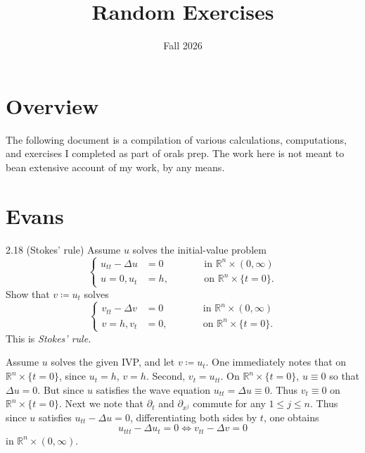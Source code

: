\documentclass{article}
\title{Random Exercises}
\author{\me}
\date{Fall 2026}
\begin{document}
\maketitle
\fullline 
\tableofcontents
\xappto\thefootnote{\relax}
\halfline 
\newpage 
\setlength{\parskip}{0.55em}

\section{Overview}

The following document is a compilation of various calculations, computations, and exercises I completed as part of orals prep. The work here is not meant to bean extensive account of my work, by any means. 

\newpage 

\section{Evans} 

\begin{prb}{2.18}
	(Stokes' rule) Assume $u$ solves the initial-value problem 
	\begin{equation*}
		\left\{
		\begin{alignedat}{3}
			u_{tt} - \Delta u &= 0 &\qquad& \text{in $\mathbb{R}^{n} \times (0, \infty)$} \\
			u =0, u_{t} &= h, &\qquad& \text{on $\mathbb{R}^{n} \times \{t = 0\}$}. 
		\end{alignedat}
		\right.
	\end{equation*}
	Show that $v \coloneqq u_{t}$ solves 
	\begin{equation*}
		\left\{
		\begin{alignedat}{3}
			v_{tt} - \Delta v &= 0 &\qquad& \text{in $\mathbb{R}^{n} \times (0, \infty)$} \\
			v =h, v_{t} &= 0, &\qquad& \text{on $\mathbb{R}^{n} \times \{t = 0\}$}. 
		\end{alignedat}
		\right.
	\end{equation*}
	This is \textit{Stokes' rule.}
\end{prb}
Assume $u$ solves the given IVP, and let $v \coloneqq u_{t}$. One immediately notes that on $\mathbb{R}^{n} \times \{t = 0\}$, since $u_{t} = h$, $v = h$. Second, $v_{t} = u_{tt}$. On $\mathbb{R}^{n} \times \{t = 0\}$, $u \equiv 0$ so that $\Delta u = 0$. But since $u$ satisfies the wave equation $u_{tt} = \Delta u \equiv 0$. Thus $v_{t} \equiv 0$ on $\mathbb{R}^{n} \times \{t = 0\}$. Next we note that $\partial_{t}$ and $\partial_{x^{j}}$ commute for any $1 \leq j \leq n$. Thus since $u$ satisfies $u_{tt} - \Delta u = 0$, differentiating both sides by $t$, one obtains 
\begin{equation*}
	u_{ttt} - \Delta u_{t} = 0 \iff v_{tt} - \Delta v = 0 
\end{equation*}
in $\mathbb{R}^{n} \times (0,\infty)$. 
\end{document}
